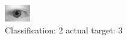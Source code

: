 \begin{figure}[h!]
\begin{center}
\includegraphics[width=0.60\columnwidth]{figures/ID661_class_2_target_3.png}
\end{center}
\caption{ Classification: 2 actual target: 3}
\label{fig:ID661_class_2_target_3}
\end{figure}
